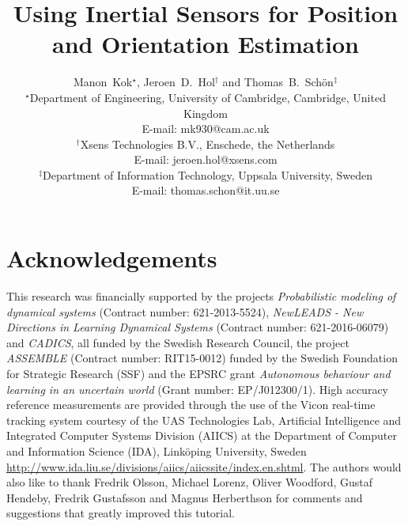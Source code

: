 \documentclass[a4paper,10pt,notitlepage]{report}
\begin{document}
\title{\textbf{Using Inertial Sensors for Position and Orientation Estimation}}

\author{Manon~Kok$^\star$, Jeroen~D.~Hol$^\dagger$ and Thomas~B.~Sch\"on$^\ddagger$ \\
\small{$^\star$Department of Engineering, University of Cambridge, Cambridge, United Kingdom} \\
\small{E-mail: mk930@cam.ac.uk} \\
\small{$^\dagger$Xsens Technologies B.V., Enschede, the Netherlands} \\
\small{E-mail: jeroen.hol@xsens.com} \\
\small{$^\ddagger$Department of Information Technology, Uppsala University, Sweden} \\
\small{E-mail: thomas.schon@it.uu.se} \\
}




\tableofcontents

















\chapter*{Acknowledgements}
This research was financially supported by the projects \emph{Probabilistic modeling of dynamical systems} (Contract number:
621-2013-5524), \emph{NewLEADS - New Directions in Learning Dynamical Systems} (Contract number: 621-2016-06079) and \emph{CADICS}, all funded by the Swedish Research Council, the project \emph{ASSEMBLE} (Contract number: RIT15-0012) funded by the Swedish Foundation for Strategic Research (SSF) and the EPSRC grant \emph{Autonomous behaviour and learning in an uncertain world} (Grant number: EP/J012300/1). High accuracy reference measurements are provided through the use of the Vicon real-time tracking system courtesy of the UAS Technologies Lab, Artificial Intelligence and Integrated Computer Systems Division (AIICS) at the Department of Computer and Information Science (IDA), Link\"oping University, Sweden \url{http://www.ida.liu.se/divisions/aiics/aiicssite/index.en.shtml}. The authors would also like to thank Fredrik Olsson, Michael Lorenz, \dr Oliver Woodford, \dr Gustaf Hendeby, \prof Fredrik Gustafsson and \prof Magnus Herberthson for comments and suggestions that greatly improved this tutorial. 

\appendix








\end{document}
